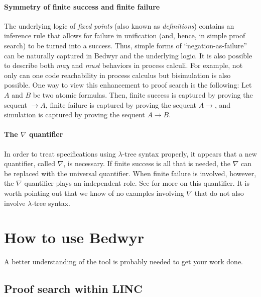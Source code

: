 \documentclass{article}
\begin{document}
\paragraph{Symmetry of finite success and finite failure}
The underlying logic of {\em fixed points} (also known as {\em
definitions})
\cite{girard92mail,schroeder-Heister93lics,mcdowell03tcs,momigliano03types}
contains an inference rule that allows for failure in unification
(and, hence, in simple proof search) to be turned into a success.
Thus, simple forms of ``negation-as-failure'' can be naturally
captured in Bedwyr and the underlying logic.  It is also possible to
describe both {\em may} and {\em must} behaviors in process calculi.
For example, not only can one code reachability in process calculus
but bisimulation is also possible.  One way to view this enhancement
to proof search is the following: Let $A$ and $B$ be two atomic
formulas.  Then, finite success is captured by proving the sequent
$\longrightarrow A$, finite failure is captured by proving the sequent
$A\longrightarrow$, and simulation is captured by proving the sequent
$A\longrightarrow B$.

\paragraph{The $\nabla$ quantifier}
In order to treat specifications using $\lambda$-tree syntax
properly, it appears that a new quantifier, called $\nabla$, is
necessary.  If finite success is all that is needed, the $\nabla$ can
be replaced with the universal quantifier.  When finite failure is
involved, however, the $\nabla$ quantifier plays an independent role.
See \cite{miller05tocl,tiu04phd,tiu05concur} for more on this
quantifier.  It is worth pointing out that we know of no examples
involving $\nabla$ that do not also involve $\lambda$-tree syntax.


\section{How to use Bedwyr}
\label{sec:howto}

A better understanding of the tool is probably needed to get your work
done. 

\subsection{Proof search within LINC}
\label{psearch}
\end{document}
